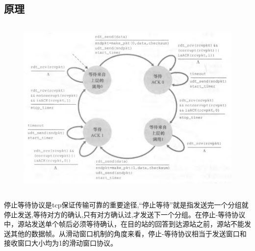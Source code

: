 \documentclass[UTF8,14pt]{article}
\numberwithin{figure}{section}
\begin{document}
\subsection{原理}
\vspace*{-0.5cm}
\begin{center}
      \begin{figure}[ht]
            \centering
            \includegraphics[width=12.6cm,height=9cm]{abp.png}
      \end{figure}
\end{center}
\vspace*{-1cm}

停止等待协议是tcp保证传输可靠的重要途径,“停止等待”就是指发送完一个分组就停止发送,等待对方的确认,只有对方确认过,才发送下一个分组。在停止-等待协议中，源站发送单个帧后必须等待确认，在目的站的回答到达源站之前，源站不能发送其他的数据帧。从滑动窗口机制的角度来看，停止-等待协议相当于发送窗口和接收窗口大小均为1的滑动窗口协议。
\end{document}
